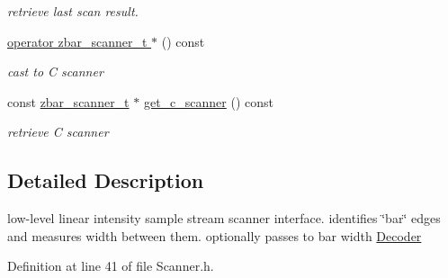\begin{DoxyCompactItemize}
\begin{DoxyCompactList}\small\item\em retrieve last scan result. \end{DoxyCompactList}\item 
\hypertarget{classzbar_1_1_scanner_a69943c76ec4d4e11b05e17bd96abbbf0}{
\hyperlink{classzbar_1_1_scanner_a69943c76ec4d4e11b05e17bd96abbbf0}{operator zbar\_\-scanner\_\-t $\ast$} () const }
\label{classzbar_1_1_scanner_a69943c76ec4d4e11b05e17bd96abbbf0}

\begin{DoxyCompactList}\small\item\em cast to C scanner \end{DoxyCompactList}\item 
\hypertarget{classzbar_1_1_scanner_aad6c4ae03f18cf14b4c4f704e9197e27}{
const \hyperlink{zbar_8h_a74102ec07b2cb6685e7ecf020d67aafa}{zbar\_\-scanner\_\-t} $\ast$ \hyperlink{classzbar_1_1_scanner_aad6c4ae03f18cf14b4c4f704e9197e27}{get\_\-c\_\-scanner} () const }
\label{classzbar_1_1_scanner_aad6c4ae03f18cf14b4c4f704e9197e27}

\begin{DoxyCompactList}\small\item\em retrieve C scanner \end{DoxyCompactList}\end{DoxyCompactItemize}


\subsection{Detailed Description}
low-\/level linear intensity sample stream scanner interface. identifies \char`\"{}bar\char`\"{} edges and measures width between them. optionally passes to bar width \hyperlink{classzbar_1_1_decoder}{Decoder} 

Definition at line 41 of file Scanner.h.



